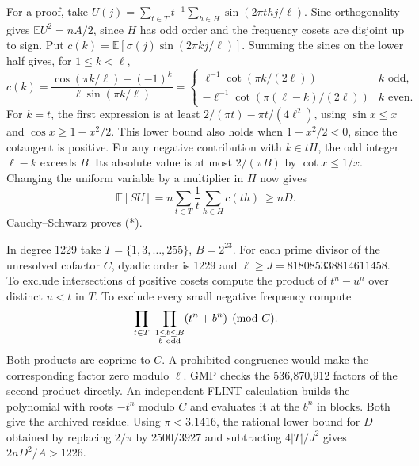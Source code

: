 \documentclass[11pt]{article}
\begin{document}
For a proof, take
\(U(j)=\sum_{t\in T}t^{-1}\sum_{h\in H}\sin(2\pi thj/\ell)\).
Sine orthogonality gives \(\mathbb E U^2=nA/2\), since \(H\) has
odd order and the frequency cosets are disjoint up to sign. Put
\(c(k)=\mathbb E[\sigma(j)\sin(2\pi kj/\ell)]\).
Summing the sines on the lower half gives, for \(1\le k<\ell\),
\[
 c(k)=\frac{\cos(\pi k/\ell)-(-1)^k}{\ell\sin(\pi k/\ell)}
   =\begin{cases}
       \ell^{-1}\cot(\pi k/(2\ell))& k\text{ odd},\\
       -\ell^{-1}\cot(\pi(\ell-k)/(2\ell))& k\text{ even}.
     \end{cases}
\]
For \(k=t\), the first expression is at least
\(2/(\pi t)-\pi t/(4\ell^2)\), using
\(\sin x\le x\) and \(\cos x\ge1-x^2/2\).
This lower bound also holds when \(1-x^2/2<0\), since the cotangent
is positive. For any negative contribution with \(k\in tH\),
the odd integer \(\ell-k\) exceeds \(B\). Its absolute value is at
most \(2/(\pi B)\) by \(\cot x\le1/x\).
Changing the uniform variable by a multiplier in \(H\) now gives
\[
 \mathbb E[SU]=n\sum_{t\in T}\frac1t\sum_{h\in H}c(th)\ \ge nD .
\]
Cauchy--Schwarz proves (*).

In degree 1229 take \(T=\{1,3,\ldots,255\}\), \(B=2^{23}\).
For each prime divisor of the unresolved cofactor \(C\), dyadic
order is 1229 and \(\ell\ge J=818085338814611458\).
To exclude intersections of positive cosets compute the product of
\(t^n-u^n\) over distinct \(u<t\) in \(T\). To exclude every small
negative frequency compute
\[
           \prod_{t\in T}\ \prod_{\substack{1\le b\le B\\b\ {\rm odd}}}
                       (t^n+b^n)\pmod C.
\]
Both products are coprime to \(C\). A prohibited congruence would
make the corresponding factor zero modulo \(\ell\). GMP checks the
536,870,912 factors of the second product directly. An independent
FLINT calculation builds the polynomial with roots \(-t^n\) modulo
\(C\) and evaluates it at the \(b^n\) in blocks. Both give the
archived residue. Using \(\pi<3.1416\), the rational lower bound for
\(D\) obtained by replacing \(2/\pi\) by \(2500/3927\) and subtracting
\(4|T|/J^2\) gives \(2nD^2/A>1226\).
\end{document}

